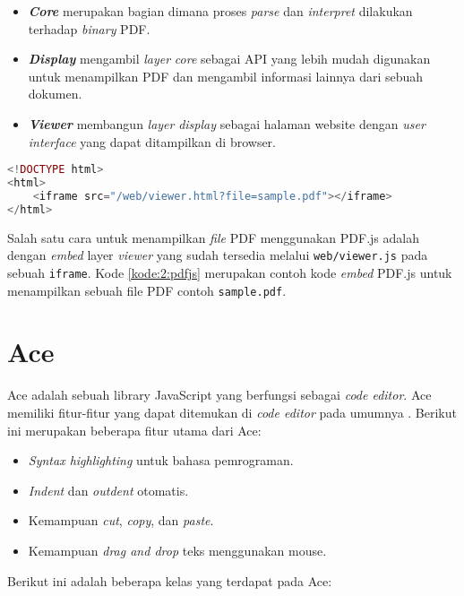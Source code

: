 \begin{itemize}
	\item \textit{\textbf{Core}} merupakan bagian dimana proses \textit{parse} dan \textit{interpret} dilakukan terhadap \textit{binary} PDF.
	\item \textit{\textbf{Display}} mengambil \textit{layer} \textit{core} sebagai API yang lebih mudah digunakan untuk menampilkan PDF dan mengambil informasi lainnya dari sebuah dokumen.
	\item \textit{\textbf{Viewer}} membangun \textit{layer} \textit{display} sebagai halaman website dengan \textit{user interface} yang dapat ditampilkan di browser.
\end{itemize}

\begin{lstlisting}[language=php, caption=Contoh kode untuk menggunakan PDF.js, label=kode:2:pdfjs]
<!DOCTYPE html>
<html>
    <iframe src="/web/viewer.html?file=sample.pdf"></iframe>
</html>
\end{lstlisting}

Salah satu cara untuk menampilkan \textit{file} PDF menggunakan PDF.js adalah dengan \textit{embed} layer \textit{viewer} yang sudah tersedia melalui \verb|web/viewer.js| pada sebuah \verb|iframe|. Kode \ref{kode:2:pdfjs} merupakan contoh kode \textit{embed} PDF.js untuk menampilkan sebuah file PDF contoh \verb|sample.pdf|.

\section{Ace}
\label{sec:2:ace} 
Ace adalah sebuah library JavaScript yang berfungsi sebagai \textit{code editor}.
Ace memiliki fitur-fitur yang dapat ditemukan di \textit{code editor} pada umumnya \cite{ace}. Berikut ini merupakan beberapa fitur utama dari Ace: 

\begin{itemize}
    \item \textit{Syntax highlighting} untuk bahasa pemrograman.
    \item \textit{Indent} dan \textit{outdent} otomatis.
    \item Kemampuan \textit{cut}, \textit{copy}, dan \textit{paste}.
    \item Kemampuan \textit{drag and drop} teks menggunakan mouse.
\end{itemize}

Berikut ini adalah beberapa kelas yang terdapat pada Ace:

